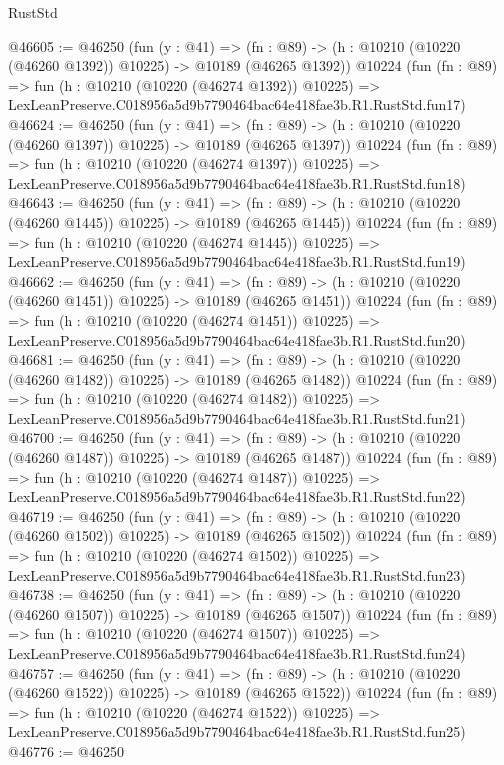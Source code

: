 \begin{lexlean}{RustStd}
\begin{coremodule}
@46605 := @46250
    (fun (y : @41) =>
    (fn : @89) -> (h : @10210 (@10220 (@46260 @1392)) @10225) -> @10189 (@46265 @1392))
    @10224
    (fun (fn : @89) =>
    fun (h : @10210 (@10220 (@46274 @1392)) @10225) =>
    LexLeanPreserve.C018956a5d9b7790464bac64e418fae3b.R1.RustStd.fun17)
@46624 := @46250
    (fun (y : @41) =>
    (fn : @89) -> (h : @10210 (@10220 (@46260 @1397)) @10225) -> @10189 (@46265 @1397))
    @10224
    (fun (fn : @89) =>
    fun (h : @10210 (@10220 (@46274 @1397)) @10225) =>
    LexLeanPreserve.C018956a5d9b7790464bac64e418fae3b.R1.RustStd.fun18)
@46643 := @46250
    (fun (y : @41) =>
    (fn : @89) -> (h : @10210 (@10220 (@46260 @1445)) @10225) -> @10189 (@46265 @1445))
    @10224
    (fun (fn : @89) =>
    fun (h : @10210 (@10220 (@46274 @1445)) @10225) =>
    LexLeanPreserve.C018956a5d9b7790464bac64e418fae3b.R1.RustStd.fun19)
@46662 := @46250
    (fun (y : @41) =>
    (fn : @89) -> (h : @10210 (@10220 (@46260 @1451)) @10225) -> @10189 (@46265 @1451))
    @10224
    (fun (fn : @89) =>
    fun (h : @10210 (@10220 (@46274 @1451)) @10225) =>
    LexLeanPreserve.C018956a5d9b7790464bac64e418fae3b.R1.RustStd.fun20)
@46681 := @46250
    (fun (y : @41) =>
    (fn : @89) -> (h : @10210 (@10220 (@46260 @1482)) @10225) -> @10189 (@46265 @1482))
    @10224
    (fun (fn : @89) =>
    fun (h : @10210 (@10220 (@46274 @1482)) @10225) =>
    LexLeanPreserve.C018956a5d9b7790464bac64e418fae3b.R1.RustStd.fun21)
@46700 := @46250
    (fun (y : @41) =>
    (fn : @89) -> (h : @10210 (@10220 (@46260 @1487)) @10225) -> @10189 (@46265 @1487))
    @10224
    (fun (fn : @89) =>
    fun (h : @10210 (@10220 (@46274 @1487)) @10225) =>
    LexLeanPreserve.C018956a5d9b7790464bac64e418fae3b.R1.RustStd.fun22)
@46719 := @46250
    (fun (y : @41) =>
    (fn : @89) -> (h : @10210 (@10220 (@46260 @1502)) @10225) -> @10189 (@46265 @1502))
    @10224
    (fun (fn : @89) =>
    fun (h : @10210 (@10220 (@46274 @1502)) @10225) =>
    LexLeanPreserve.C018956a5d9b7790464bac64e418fae3b.R1.RustStd.fun23)
@46738 := @46250
    (fun (y : @41) =>
    (fn : @89) -> (h : @10210 (@10220 (@46260 @1507)) @10225) -> @10189 (@46265 @1507))
    @10224
    (fun (fn : @89) =>
    fun (h : @10210 (@10220 (@46274 @1507)) @10225) =>
    LexLeanPreserve.C018956a5d9b7790464bac64e418fae3b.R1.RustStd.fun24)
@46757 := @46250
    (fun (y : @41) =>
    (fn : @89) -> (h : @10210 (@10220 (@46260 @1522)) @10225) -> @10189 (@46265 @1522))
    @10224
    (fun (fn : @89) =>
    fun (h : @10210 (@10220 (@46274 @1522)) @10225) =>
    LexLeanPreserve.C018956a5d9b7790464bac64e418fae3b.R1.RustStd.fun25)
@46776 := @46250

\end{coremodule}
\end{lexlean}
